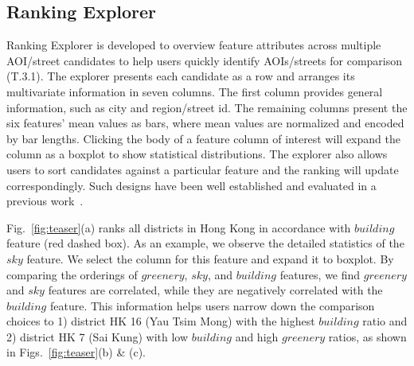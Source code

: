 \subsection{Ranking Explorer}
Ranking Explorer is developed to overview feature attributes across multiple AOI/street candidates to help users quickly identify AOIs/streets for comparison (T.3.1).
The explorer presents each candidate as a row and arranges its multivariate information in seven columns.
The first column provides general information, such as city and region/street id. 
The remaining columns present the six features' mean values as bars, where mean values are normalized and encoded by bar lengths.
Clicking the body of a feature column of interest will expand the column as a boxplot to show statistical distributions.
The explorer also allows users to sort candidates against a particular feature and the ranking will update correspondingly.
Such designs have been well established and evaluated in a previous work~\cite{liu_2017_smartAdP}.

Fig.~\ref{fig:teaser}(a) ranks all districts in Hong Kong in accordance with $building$ feature (red dashed box).
As an example, we observe the detailed statistics of the $sky$ feature.
We select the column for this feature and expand it to boxplot. 
By comparing the orderings of $greenery$, $sky$, and $building$ features, we find $greenery$ and $sky$ features are correlated, while they are negatively correlated with the $building$ feature.
This information helps users narrow down the comparison choices to 1) district HK 16 (Yau Tsim Mong) with the highest $building$ ratio and 2) district HK 7 (Sai Kung) with low $building$ and high $greenery$ ratios, as shown in Figs.~\ref{fig:teaser}(b) \& (c).  

